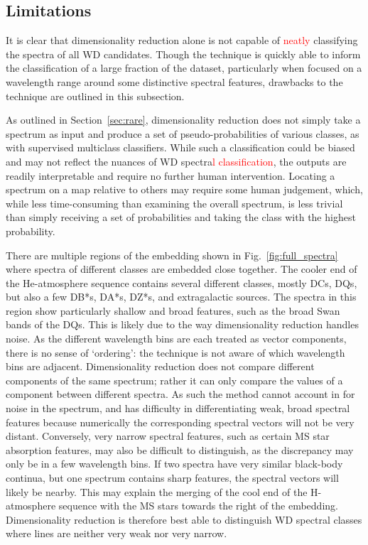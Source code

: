 \documentclass[fleqn,usenatbib]{mnras}
\newcommand{\red}[1]{\textcolor{red}{#1}}
\begin{document}
\subsection{Limitations}

It is clear that dimensionality reduction alone is not capable of \red{neatly} classifying the spectra of all WD candidates.
Though the technique is quickly able to inform the classification of a large fraction of the dataset, particularly when focused on a wavelength range around some distinctive spectral features, drawbacks to the technique are outlined in this subsection.

As outlined in Section~\ref{sec:rare}, dimensionality reduction does not simply take a spectrum as input and produce a set of pseudo-probabilities of various classes, as with supervised multiclass classifiers.
While such a classification could be biased and may not reflect the nuances of WD spectra\red{l classification}, the outputs are readily interpretable and require no further human intervention.
Locating a spectrum on a map relative to others may require some human judgement, which, while less time-consuming than examining the overall spectrum, is less trivial than simply receiving a set of probabilities and taking the class with the highest probability.

There are multiple regions of the embedding shown in Fig.~\ref{fig:full_spectra} where spectra of different classes are embedded close together.
The cooler end of the He-atmosphere sequence contains several different classes, mostly DCs, DQs, but also a few DB*s, DA*s, DZ*s, and extragalactic sources.
The spectra in this region show particularly shallow and broad features, such as the broad  Swan bands of the DQs.
This is likely due to the way dimensionality reduction handles noise.
As the different wavelength bins are each treated as vector components, there is no sense of `ordering': the technique is not aware of which wavelength bins are adjacent.
Dimensionality reduction does not compare different components of the same spectrum; rather it can only compare the values of a component between different spectra.
As such the method cannot account in for noise in the spectrum, and has difficulty in differentiating weak, broad spectral features because numerically the corresponding spectral vectors will not be very distant.
Conversely, very narrow spectral features, such as certain MS star absorption features, may also be difficult to distinguish, as the discrepancy may only be in a few wavelength bins.
If two spectra have very similar black-body continua, but one spectrum contains sharp features, the spectral vectors will likely be nearby.
This may explain the merging of the cool end of the H-atmosphere sequence with the MS stars towards the right of the embedding.
Dimensionality reduction is therefore best able to distinguish WD spectral classes where lines are neither very weak nor very narrow.
\end{document}
